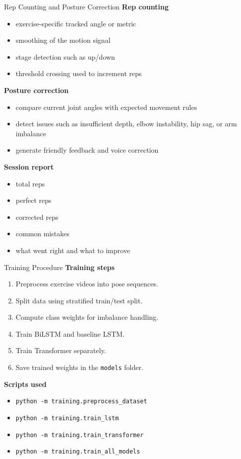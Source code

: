 \documentclass[aspectratio=169]{beamer}
\begin{document}
\begin{frame}{Rep Counting and Posture Correction}
\small
\textbf{Rep counting}
\begin{itemize}
  \item exercise-specific tracked angle or metric
  \item smoothing of the motion signal
  \item stage detection such as up/down
  \item threshold crossing used to increment reps
\end{itemize}

\textbf{Posture correction}
\begin{itemize}
  \item compare current joint angles with expected movement rules
  \item detect issues such as insufficient depth, elbow instability, hip sag, or arm imbalance
  \item generate friendly feedback and voice correction
\end{itemize}

\textbf{Session report}
\begin{itemize}
  \item total reps
  \item perfect reps
  \item corrected reps
  \item common mistakes
  \item what went right and what to improve
\end{itemize}
\end{frame}

\begin{frame}{Training Procedure}
\small
\textbf{Training steps}
\begin{enumerate}
  \item Preprocess exercise videos into pose sequences.
  \item Split data using stratified train/test split.
  \item Compute class weights for imbalance handling.
  \item Train BiLSTM and baseline LSTM.
  \item Train Transformer separately.
  \item Save trained weights in the \texttt{models} folder.
\end{enumerate}

\vspace{0.3cm}
\textbf{Scripts used}
\begin{itemize}
  \item \texttt{python -m training.preprocess\_dataset}
  \item \texttt{python -m training.train\_lstm}
  \item \texttt{python -m training.train\_transformer}
  \item \texttt{python -m training.train\_all\_models}
\end{itemize}
\end{frame}
\end{document}
